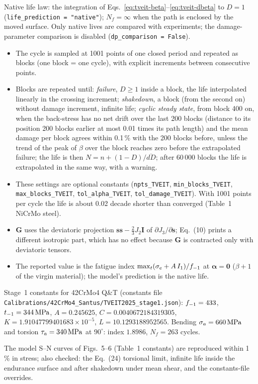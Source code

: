  Native life law: the integration of Eqs.~\eqref{eq:tveit-beta}--\eqref{eq:tveit-dbeta} to
$D=1$ (\texttt{life\_prediction = "native"}); $N_f=\infty$ when the path is enclosed by the moved
surface. Only native lives are compared with experiments; the damage-parameter comparison is disabled
(\texttt{dp\_comparison = False}).

\begin{itemize}
\item The cycle is sampled at 1001 points of one closed period and repeated as blocks (one block = one
  cycle), with explicit increments between consecutive points.
\item Blocks are repeated until: \emph{failure}, $D\ge1$ inside a block, the life interpolated linearly
  in the crossing increment; \emph{shakedown}, a block (from the second on) without damage increment,
  infinite life; \emph{cyclic steady state}, from block 400 on, when the back-stress has no net drift
  over the last 200 blocks (distance to its position 200 blocks earlier at most 0.01 times its path
  length) and the mean damage per block agrees within 0.1\,\% with the 200 blocks before, unless the
  trend of the peak of $\beta$ over the block reaches zero before the extrapolated failure; the life is
  then $N=n+(1-D)/\overline{dD}$; after 60\,000 blocks the life is extrapolated in the same way, with a
  warning.
\item These settings are optional constants (\texttt{npts\_TVEIT}, \texttt{min\_blocks\_TVEIT},
  \texttt{max\_blocks\_TVEIT}, \texttt{tol\_alpha\_TVEIT}, \texttt{tol\_damage\_TVEIT}). With 1001 points
  per cycle the life is about 0.02 decade shorter than converged (Table~1 NiCrMo steel).
\item $\mathbf G$ uses the deviatoric projection $\mathbf s\mathbf s-\tfrac23J_2\mathbf I$ of
  $\partial J_3/\partial\mathbf s$; Eq.~(10) prints a different isotropic part, which has no effect
  because $\mathbf G$ is contracted only with deviatoric tensors.
\item The reported value is the fatigue index $\max_t(\sigma_e+A\,I_1)/f_{-1}$ at $\boldsymbol\alpha=\mathbf 0$
  ($\beta+1$ of the virgin material); the model's prediction is the native life.
\end{itemize}

 Stage~1 constants for 42CrMo4 Q\&T (constants file
\texttt{Calibrations/42CrMo4\_Santus/TVEIT2025\_stage1.json}): $f_{-1}=433$, $t_{-1}=344\,\mathrm{MPa}$, $A=0.245625$,
$C=0.0040672184319305$, $K=1.91047799401683\times10^{-5}$, $L=10.1293188952565$. Bending
$\sigma_a=660\,\mathrm{MPa}$ and torsion $\tau_a=340\,\mathrm{MPa}$ at $90^\circ$: index $1.8986$, $N_f=263$ cycles.

 The model S--N curves of Figs.~5--6 (Table~1 constants) are reproduced within 1\,\%
in stress; also checked: the Eq.~(24) torsional limit, infinite life inside the endurance surface and
after shakedown under mean shear, and the constants-file overrides.
